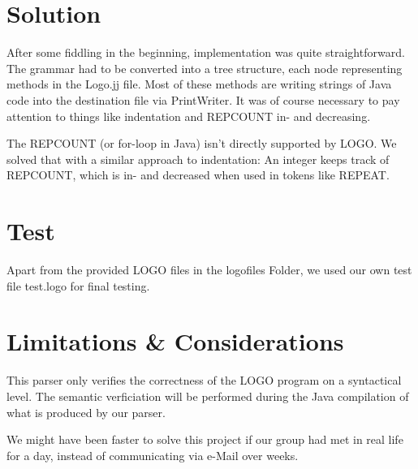 \documentclass[
	a4paper,					%
	10pt,							%
	twoside,					%
	notitlepage,			%
	parskip=half,			%
]{scrreprt}					%
\begin{document}

\color{black}





\chapter{Solution}
\label{chap:solution}
After some fiddling in the beginning, implementation was quite straightforward. The grammar had to be converted into a tree structure, each node representing methods in the Logo.jj file. Most of these methods are writing strings of Java code into the destination file via PrintWriter. It was of course necessary to pay attention to things like indentation and REPCOUNT in- and decreasing.

The REPCOUNT (or for-loop in Java) isn't directly supported by LOGO. We solved that with a similar approach to indentation: An integer keeps track of REPCOUNT, which is in- and decreased when used in tokens like REPEAT.

\begingroup
\renewcommand{\cleardoublepage}{}
\renewcommand{\clearpage}{}
\chapter{Test}
\label{chap:test}
Apart from the provided LOGO files in the logofiles Folder, we used our own test file test.logo for final testing.
\endgroup

\begingroup
\renewcommand{\cleardoublepage}{}
\renewcommand{\clearpage}{}

\chapter{Limitations \& Considerations}
\label{chap:limits}
This parser only verifies the correctness of the LOGO program on a syntactical level. The semantic verficiation will be performed during the Java compilation of what is produced by our parser.

We might have been faster to solve this project if our group had met in real life for a day, instead of communicating via e-Mail over weeks.
\endgroup
\end{document}
